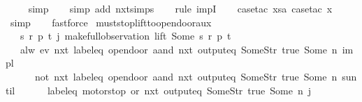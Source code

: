 \begin{isabellebody}
\ \ \ \isamarkupfalse%
\ simp\isanewline
\ \ \isamarkupfalse%
\ {\isacharparenleft}simp\ add{\isacharcolon}\ nxt{\isachardot}simps{\isacharparenright}\isanewline
\ \ \isamarkupfalse%
\ {\isacharparenleft}rule\ impI{\isacharparenright}\isanewline
\ \ \isamarkupfalse%
\ {\isacharparenleft}case{\isacharunderscore}tac\ {\isachardoublequoteopen}xsa{\isachardoublequoteclose}{\isacharcomma}\ case{\isacharunderscore}tac\ x{}{\isacharparenright}\isanewline
\ \ \isamarkupfalse%
\ simp\isanewline
\ \ \isamarkupfalse%
\ fastforce%
\endisatagproof
{\isafoldproof}%
%
\isadelimproof
\isanewline
%
\endisadelimproof
\isanewline
{}\isamarkupfalse%
\ must{\isacharunderscore}stop{\isacharunderscore}lift{\isacharunderscore}to{\isacharunderscore}open{\isacharunderscore}door{\isacharunderscore}aux\ {\isacharcolon}\isanewline
\ \ \ {\isachardoublequoteopen}{\isasymexists}s\ r\ p\ t{\isachardot}\ j{\isacharequal}\ make{\isacharunderscore}full{\isacharunderscore}observation\ lift\ {\isacharparenleft}Some\ s{\isacharparenright}\ r\ p\ t{\isachardoublequoteclose}\isanewline
\ \ \ {\isachardoublequoteopen}alw\ {\isacharparenleft}{\isacharparenleft}ev\ {\isacharparenleft}nxt\ {\isacharparenleft}{\isacharparenleft}label{\isacharunderscore}eq\ {\isacharprime}{\isacharprime}opendoor{\isacharprime}{\isacharprime}{\isacharparenright}\ aand\ {\isacharparenleft}nxt\ {\isacharparenleft}output{\isacharunderscore}eq\ {\isacharbrackleft}Some{\isacharparenleft}Str\ {\isacharprime}{\isacharprime}true{\isacharprime}{\isacharprime}{\isacharparenright}{\isacharcomma}\ Some\ n{\isacharbrackright}{\isacharparenright}{\isacharparenright}{\isacharparenright}{\isacharparenright}{\isacharparenright}\ impl\isanewline
\ \ \ \ \ \ {\isacharparenleft}{\isacharparenleft}not\ {\isacharparenleft}nxt\ {\isacharparenleft}{\isacharparenleft}label{\isacharunderscore}eq\ {\isacharprime}{\isacharprime}opendoor{\isacharprime}{\isacharprime}{\isacharparenright}\ aand\ {\isacharparenleft}nxt\ {\isacharparenleft}output{\isacharunderscore}eq\ {\isacharbrackleft}Some{\isacharparenleft}Str\ {\isacharprime}{\isacharprime}true{\isacharprime}{\isacharprime}{\isacharparenright}{\isacharcomma}\ Some\ n{\isacharbrackright}{\isacharparenright}{\isacharparenright}{\isacharparenright}{\isacharparenright}{\isacharparenright}\ suntil\isanewline
\ \ \ \ \ \ {\isacharparenleft}{\isacharparenleft}{\isacharparenleft}label{\isacharunderscore}eq\ {\isacharprime}{\isacharprime}motorstop{\isacharprime}{\isacharprime}{\isacharparenright}\ or\ {\isacharparenleft}nxt\ {\isacharparenleft}output{\isacharunderscore}eq\ {\isacharbrackleft}Some{\isacharparenleft}Str\ {\isacharprime}{\isacharprime}true{\isacharprime}{\isacharprime}{\isacharparenright}{\isacharcomma}\ Some\ n{\isacharbrackright}{\isacharparenright}{\isacharparenright}{\isacharparenright}{\isacharparenright}{\isacharparenright}{\isacharparenright}\ j{\isachardoublequoteclose}\isanewline

\end{isabellebody}
